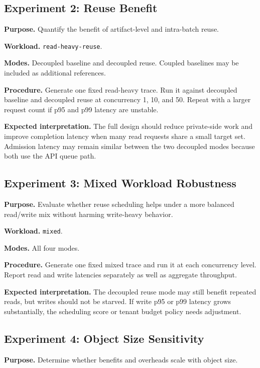 \documentclass[11pt]{article}
\begin{document}
\subsection{Experiment 2: Reuse Benefit}

\textbf{Purpose.}
Quantify the benefit of artifact-level and intra-batch reuse.

\textbf{Workload.}
\texttt{read-heavy-reuse}.

\textbf{Modes.}
Decoupled baseline and decoupled reuse.  Coupled baselines may be included as
additional references.

\textbf{Procedure.}
Generate one fixed read-heavy trace.  Run it against decoupled baseline and
decoupled reuse at concurrency 1, 10, and 50.  Repeat with a larger request
count if p95 and p99 latency are unstable.

\textbf{Expected interpretation.}
The full design should reduce private-side work and improve completion latency
when many read requests share a small target set.  Admission latency may remain
similar between the two decoupled modes because both use the API queue path.

\subsection{Experiment 3: Mixed Workload Robustness}

\textbf{Purpose.}
Evaluate whether reuse scheduling helps under a more balanced read/write mix
without harming write-heavy behavior.

\textbf{Workload.}
\texttt{mixed}.

\textbf{Modes.}
All four modes.

\textbf{Procedure.}
Generate one fixed mixed trace and run it at each concurrency level.  Report
read and write latencies separately as well as aggregate throughput.

\textbf{Expected interpretation.}
The decoupled reuse mode may still benefit repeated reads, but writes should not
be starved.  If write p95 or p99 latency grows substantially, the scheduling
score or tenant budget policy needs adjustment.

\subsection{Experiment 4: Object Size Sensitivity}

\textbf{Purpose.}
Determine whether benefits and overheads scale with object size.
\end{document}
